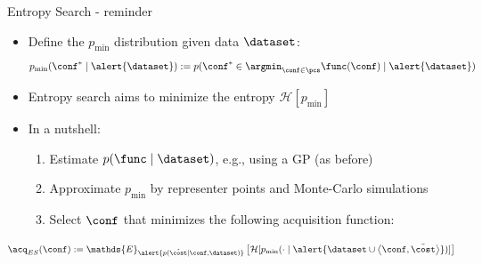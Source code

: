 \begin{frame}[c]{Entropy Search - reminder}

\begin{itemize}
		\item Define the $p_{\text{min}}$ distribution given data $\dataset$:
		$$p_{\text{min}}(\conf^* \mid \alert{\dataset}) := p(\conf^* \in \argmin_{\conf\in \pcs} \func(\conf) \mid \alert{\dataset})$$
	
		\item Entropy search aims to minimize the entropy \alert{$\mathcal{H}[p_\text{min}]$} 
		\item In a nutshell:
		\begin{enumerate}
			\item Estimate $p(\func \mid \dataset)$, e.g., using a GP (as before)
			\item Approximate $p_\text{min}$ by representer points and Monte-Carlo simulations
			\item Select $\conf$ that minimizes the following acquisition function:
		\end{enumerate}
\end{itemize}
\vspace*{0.5cm}
	\[{\acq}_{ES}(\conf) := \mathds{E}_{\alert{p(\tilde{\cost}\mid \conf, \dataset)}} 
	\left[   \mathcal{H}[p_{\text{min}}(\cdot \mid \alert{\dataset \cup \left\langle \conf, \tilde{\cost} \right\rangle })] \right]\]

\end{frame}

